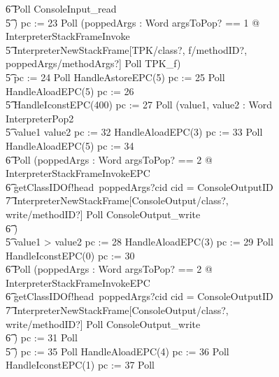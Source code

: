 \begin{figure}[tp!]
{\begin{circus}
    \t6 Poll \circseq ConsoleInput\_read \\
    \t5 \circfi) \circseq pc := 23 \circseq Poll \circseq (\circvar poppedArgs : \seq Word \circspot \lschexpract \exists argsToPop? == 1 @ InterpreterStackFrameInvoke \rschexpract \circseq \\
    \t5 \lschexpract InterpreterNewStackFrame[TPK/class?, f/methodID?, poppedArgs/methodArgs?] \rschexpract \circseq Poll \circseq TPK\_f) \circseq \\
    \t5 pc := 24 \circseq Poll \circseq HandleAstoreEPC(5) \circseq pc := 25 \circseq Poll \circseq HandleAloadEPC(5) \circseq pc := 26 \circseq \\
    \t5 HandleIconstEPC(400) \circseq pc := 27 \circseq Poll \circseq (\circvar value1, value2 : Word \circspot InterpreterPop2 \circseq \\
    \t5 \circif value1 \leq value2 \circthen pc := 32 \circseq HandleAloadEPC(3) \circseq pc := 33 \circseq Poll \circseq HandleAloadEPC(5) \circseq pc := 34 \circseq \\
    \t6 Poll \circseq (\circvar poppedArgs : Word \circspot \lschexpract \exists argsToPop? == 2 @ InterpreterStackFrameInvokeEPC \rschexpract \circseq \\
    \t6 getClassIDOf!head~poppedArgs?cid \then \circif cid = ConsoleOutputID \circthen {} \\
    \t7 \lschexpract InterpreterNewStackFrame[ConsoleOutput/class?, write/methodID?] \rschexpract \circseq  Poll \circseq ConsoleOutput\_write \\
    \t6 \circfi) \\
    \t5 {} \circelse value1 > value2 \circthen pc := 28 \circseq HandleAloadEPC(3) \circseq pc := 29 \circseq Poll \circseq HandleIconstEPC(0) \circseq pc := 30 \circseq \\
    \t6 Poll \circseq (\circvar poppedArgs : Word \circspot \lschexpract \exists argsToPop? == 2 @ InterpreterStackFrameInvokeEPC \rschexpract \circseq \\
    \t6 getClassIDOf!head~poppedArgs?cid \then \circif cid = ConsoleOutputID \circthen {} \\
    \t7 \lschexpract InterpreterNewStackFrame[ConsoleOutput/class?, write/methodID?] \rschexpract \circseq  Poll \circseq ConsoleOutput\_write \\
    \t6 \circfi) \circseq pc := 31 \circseq Poll \\
    \t5 \circfi) \circseq pc := 35 \circseq Poll \circseq HandleAloadEPC(4) \circseq pc := 36 \circseq Poll \circseq HandleIconstEPC(1) \circseq pc := 37 \circseq Poll \circseq \\

\end{circus}}
\end{figure}
